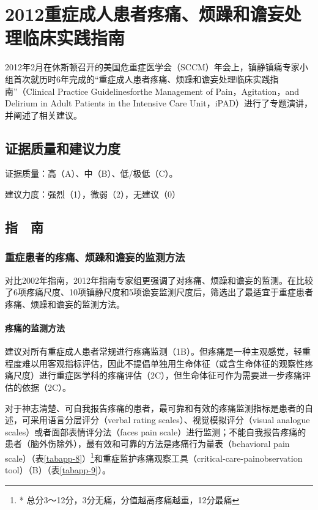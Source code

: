 \protect\hypertarget{text00036.html}{}{}

\chapter{2012重症成人患者疼痛、烦躁和谵妄处理临床实践指南}

2012年2月在休斯顿召开的美国危重症医学会（SCCM）年会上，镇静镇痛专家小组首次就历时6年完成的“重症成人患者疼痛、烦躁和谵妄处理临床实践指南”（Clinical
Practice Guidelinesforthe Management of Pain，Agitation，and Delirium in
Adult Patients in the Intensive Care
Unit，iPAD）进行了专题演讲，并阐述了相关建议。

\section{证据质量和建议力度}

证据质量：高（A）、中（B）、低/极低（C）。

建议力度：强烈（1），微弱（2），无建议（0）

\section{指　南}

\subsection{重症患者的疼痛、烦躁和谵妄的监测方法}

对比2002年指南，2012年指南专家组更强调了对疼痛、烦躁和谵妄的监测。在比较了6项疼痛尺度、10项镇静尺度和5项谵妄监测尺度后，筛选出了最适宜于重症患者疼痛、烦躁和谵妄的监测方法。

\subsubsection{疼痛的监测方法}

建议对所有重症成人患者常规进行疼痛监测（1B）。但疼痛是一种主观感觉，轻重程度难以用客观指标评估，因此不提倡单独用生命体征（或含生命体征的观察性疼痛尺度）进行重症医学科的疼痛评估（2C），但生命体征可作为需要进一步疼痛评估的依据（2C）。

对于神志清楚、可自我报告疼痛的患者，最可靠和有效的疼痛监测指标是患者的自述，可采用语言分层评分（verbal
rating scales）、视觉模拟评分（visual analogue
scales）或者面部表情评分法（faces pain
scale）进行监测；不能自我报告疼痛的患者（脑外伤除外），最有效和可靠的方法是疼痛行为量表（behavioral
pain
scale）（表\ref{tabapp-8}）\footnote{* 总分3～12分，3分无痛，分值越高疼痛越重，12分最痛}和重症监护疼痛观察工具（critical-care-painobservation
tool）（B）（表\ref{tabapp-9}）。

